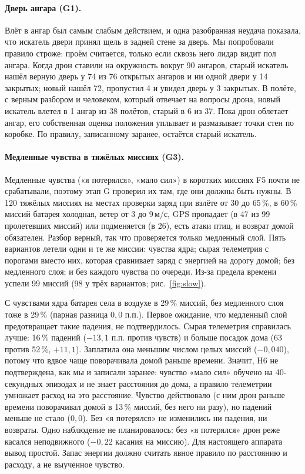 \paragraph{Дверь ангара (G1).} Влёт в ангар был самым слабым действием, и одна разобранная неудача показала, что искатель двери
принял щель в задней стене за дверь. Мы попробовали правило строже: проём считается, только если сквозь него лидар видит пол
ангара. Когда дрон ставили на окружность вокруг 90 ангаров, старый искатель нашёл верную дверь у 74 из 76 открытых ангаров и ни
одной двери у 14 закрытых; новый нашёл 72, пропустил 4 и увидел дверь у 3 закрытых. В полёте, с верным разбором и человеком,
который отвечает на вопросы дрона, новый искатель влетел в 1 ангар из 38 полётов, старый в 6 из 37. Пока дрон облетает ангар,
его собственная оценка положения уплывает и размазывает точки стен по коробке. По правилу, записанному заранее, остаётся старый
искатель.

\paragraph{Медленные чувства в тяжёлых миссиях (G3).} Медленные чувства («я потерялся», «мало сил») в коротких миссиях F5 почти
не срабатывали, поэтому этап G проверил их там, где они должны быть нужны. В 120 тяжёлых миссиях на местах проверки заряд при
взлёте от 30 до 65\,\%, в 60\,\% миссий батарея холодная, ветер от 3 до 9\,м/с, GPS пропадает (в 47 из 99 пролетевших миссий) или подменяется (в 26), есть атаки птиц,
и возврат домой обязателен. Разбор верный, так что проверяется только медленный слой. Пять вариантов летели одни и те же миссии:
чувства ядра; сырая телеметрия с порогами вместо них, которая сравнивает заряд с энергией на дорогу домой; без медленного слоя; и
без каждого чувства по очереди. Из-за предела времени успели 99 миссий (98 у трёх вариантов; рис.~\ref{fig:slow}).

С чувствами ядра батарея села в воздухе в 29\,\% миссий, без медленного слоя тоже в 29\,\% (парная разница
$0{,}0$ п.п.). Первое ожидание, что медленный слой предотвращает такие падения, не подтвердилось. Сырая
телеметрия справилась лучше: 16\,\% падений ($-13{,}1$ п.п. против чувств) и больше посадок дома (63 против
52\,\%, $+11{,}1$). Заплатила она меньшим числом целых миссий ($-0{,}040$), потому что
вдвое чаще поворачивала домой раньше времени. Значит, H6 не подтверждена, как мы и записали заранее: чувство «мало сил» обучено
на 40-секундных эпизодах и не знает расстояния до дома, а правило телеметрии умножает расход на это расстояние. Чувство
действовало (с ним дрон раньше времени поворачивал домой в 13\,\% миссий, без него ни разу), но падений меньше не стало
($0{,}0$). Без «я потерялся» не изменились ни падения, ни возвраты. Одно наблюдение не планировалось: без
«я потерялся» дрон реже касался неподвижного ($-0{,}22$ касания на миссию). Для настоящего аппарата вывод
простой. Запас энергии должно считать явное правило по расстоянию и расходу, а не выученное чувство.

